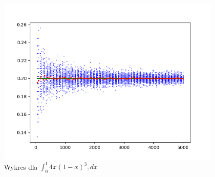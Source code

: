 \documentclass[12pt]{report}
\begin{document}
\begin{figure}[h]
\centering
\includegraphics{4x(1-x)3.png}
\caption[Example .]{Wykres dla \(\int_{0}^{1} 4x(1-x)^{3} ,dx\)}
\label{...}
\end{figure}
\end{document}
